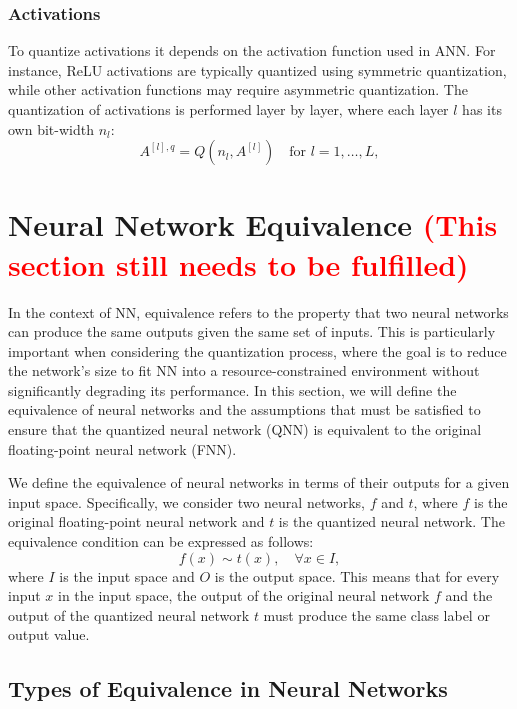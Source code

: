 \subsubsection*{Activations}

To quantize activations it depends on the activation function used in ANN. For instance, ReLU activations are typically quantized using symmetric quantization, while other activation functions may require asymmetric quantization. The quantization of activations is performed layer by layer, where each layer $l$ has its own bit-width $n_l$:
\begin{equation}
A^{[l],q} = Q(n_l, A^{[l]}) \quad \text{for } l = 1, \dots, L,
\end{equation}



\section{Neural Network Equivalence \textcolor{red}{(This section still needs to be fulfilled)}}

In the context of NN, equivalence refers to the property that two neural networks can produce the same outputs given the same set of inputs. This is particularly important when considering the quantization process, where the goal is to reduce the network's size to fit NN into a resource-constrained environment without significantly degrading its performance.
In this section, we will define the equivalence of neural networks and the assumptions that must be satisfied to ensure that the quantized neural network (QNN) is equivalent to the original floating-point neural network (FNN).

We define the equivalence of neural networks in terms of their outputs for a given input space. Specifically, we consider two neural networks, $f$ and $t$, where $f$ is the original floating-point neural network and $t$ is the quantized neural network. The equivalence condition can be expressed as follows:
\begin{equation}
f(x) \sim t(x), \quad \forall x \in I,
\end{equation}
where $I$ is the input space and $O$ is the output space. This means that for every input $x$ in the input space, the output of the original neural network $f$ and the output of the quantized neural network $t$ must produce the same class label or output value.

\subsection{Types of Equivalence in Neural Networks}

